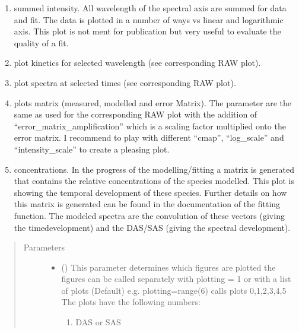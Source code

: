 \documentclass[letterpaper,10pt,english]{sphinxmanual}
\begin{document}
\begin{fulllineitems}
\begin{fulllineitems}
\begin{enumerate}
\item {} 
summed intensity. All wavelength of the spectral axis are summed for
data and fit. The data is plotted in a number of ways vs linear and
logarithmic axis. This plot is not ment for publication but very
useful to evaluate the quality of a fit.

\item {} 
plot kinetics for selected wavelength (see corresponding RAW plot).

\item {} 
plot spectra at selected times (see corresponding RAW plot).

\item {} 
plots matrix (measured, modelled and error Matrix). The parameter are
the same as used for the corresponding RAW plot with the addition of
“error\_matrix\_amplification” which is a scaling factor multiplied
onto the error matrix. I recommend to play with different “cmap”,
“log\_scale” and “intensity\_scale” to create a pleasing plot.

\item {} 
concentrations. In the progress of the modelling/fitting a matrix is
generated that contains the relative concentrations of the species
modelled. This plot is showing the temporal development of these
species. Further details on how this matrix is generated can be found
in the documentation of the fitting function. The modeled spectra are
the convolution of these vectors (giving the time\sphinxhyphen{}development) and
the DAS/SAS (giving the spectral development).

\end{enumerate}
\begin{quote}\begin{description}
\item[{Parameters}] \leavevmode\begin{itemize}
\item {} 
 (\sphinxstyleliteralemphasis{\sphinxupquote{ (}}\sphinxstyleliteralemphasis{\sphinxupquote{)}}\sphinxstyleliteralemphasis{\sphinxupquote{, }}) \textendash{} 
This parameter determines which figures are plotted
the figures can be called separately with plotting = 1
or with a list of plots (Default) e.g. plotting=range(6) calls plots 0,1,2,3,4,5
The plots have the following numbers:
\begin{enumerate}
%
\setcounter{enumi}{-1}
\item {} 
DAS or SAS


\end{enumerate}
\end{itemize}
\end{description}
\end{quote}
\end{fulllineitems}
\end{fulllineitems}
\end{document}
